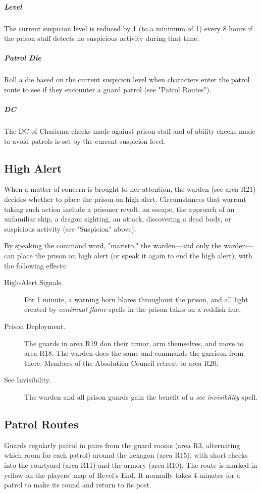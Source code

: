 \documentclass[10pt,a4paper,twoside,bg=print,twocolumn,openany,nodeprecatedcode]{dndbook}
\begin{document}
\subparagraph{Level}
The current suspicion level is reduced by 1 (to a minimum of 1) every 8 hours if the prison staff detects no suspicious activity during that time.

\subparagraph{Patrol Die}
Roll a die based on the current suspicion level when characters enter the patrol route to see if they encounter a guard patrol (see "Patrol Routes").

\subparagraph{DC}
The DC of Charisma checks made against prison staff and of ability checks made to avoid patrols is set by the current suspicion level.

\subsection{High Alert}
When a matter of concern is brought to her attention, the warden (see area R21) decides whether to place the prison on high alert. Circumstances that warrant taking such action include a prisoner revolt, an escape, the approach of an unfamiliar ship, a dragon sighting, an attack, discovering a dead body, or suspicious activity (see "Suspicion" above).

By speaking the command word, "maristo," the warden—and only the warden—can place the prison on high alert (or speak it again to end the high alert), with the following effects:


\begin{description}
\item[High-Alert Signals.]
For 1 minute, a warning horn blares throughout the prison, and all light created by \textit{continual flame} spells in the prison takes on a reddish hue.
\item[Prison Deployment.]
The guards in area R19 don their armor, arm themselves, and move to area R18. The warden does the same and commands the garrison from there. Members of the Absolution Council retreat to area R20.
\item[See Invisibility.]
The warden and all prison guards gain the benefit of a \textit{see invisibility} spell.
\end{description}

\subsection{Patrol Routes}
Guards regularly patrol in pairs from the guard rooms (area R3, alternating which room for each patrol) around the hexagon (area R15), with short checks into the courtyard (area R11) and the armory (area R10). The route is marked in yellow on the players' map of Revel's End. It normally takes 4 minutes for a patrol to make its round and return to its post.
\end{document}
